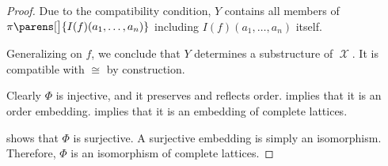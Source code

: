 \begin{proof}
  Due to the compatibility condition, \( Y \) contains all members of \( \pi\parens[\big]{ I(f)(a_1, \ldots, a_n) } \) including \( I(f)(a_1, \ldots, a_n) \) itself.

  Generalizing on \( f \), we conclude that \( Y \) determines a substructure of \( \mscrX \). It is compatible with \( {\cong} \) by construction.

   Clearly \( \Phi \) is injective, and it preserves and reflects order.  implies that it is an order embedding.  implies that it is an embedding of complete lattices.

   shows that \( \Phi \) is surjective. A surjective embedding is simply an isomorphism. Therefore, \( \Phi \) is an isomorphism of complete lattices.
\end{proof}
